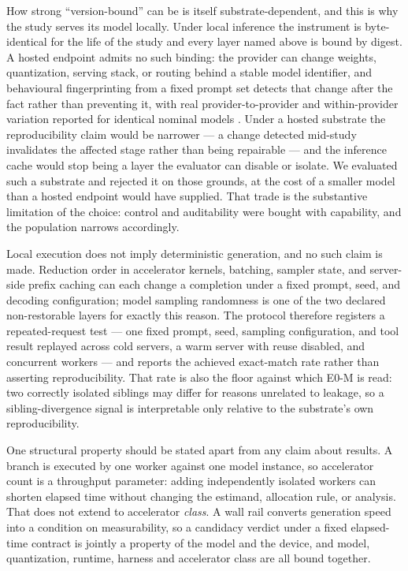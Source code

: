 How strong ``version-bound'' can be is itself substrate-dependent, and this is
why the study serves its model locally.  Under local inference the instrument is
byte-identical for the life of the study and every layer named above is bound by
digest.  A hosted endpoint admits no such binding: the provider can change
weights, quantization, serving stack, or routing behind a stable model
identifier, and behavioural fingerprinting from a fixed prompt set detects that
change after the fact rather than preventing it, with real
provider-to-provider and within-provider variation reported for identical
nominal models \citep{fingerprints2026}.  Under a hosted substrate the
reproducibility claim would be narrower --- a change detected mid-study
invalidates the affected stage rather than being repairable --- and the inference
cache would stop being a layer the evaluator can disable or isolate.  We
evaluated such a substrate and rejected it on those grounds, at the cost of a
smaller model than a hosted endpoint would have supplied.  That trade is the
substantive limitation of the choice: control and auditability were bought with
capability, and the population narrows accordingly.

Local execution does not imply deterministic generation, and no such claim is
made.  Reduction order in accelerator kernels, batching, sampler state, and
server-side prefix caching can each change a completion under a fixed prompt,
seed, and decoding configuration; model sampling randomness is one of the two
declared non-restorable layers for exactly this reason.  The protocol therefore
registers a repeated-request test --- one fixed prompt, seed, sampling
configuration, and tool result replayed across cold servers, a warm server with
reuse disabled, and concurrent workers --- and reports the achieved exact-match
rate rather than asserting reproducibility.  That rate is also the floor against
which E0-M is read: two correctly isolated siblings may differ for reasons
unrelated to leakage, so a sibling-divergence signal is interpretable only
relative to the substrate's own reproducibility.

One structural property should be stated apart from any claim about results.  A
branch is executed by one worker against one model instance, so accelerator
count is a throughput parameter: adding independently isolated workers can
shorten elapsed time without changing the estimand, allocation rule, or
analysis.  That does not extend to accelerator \emph{class}.  A wall rail
converts generation speed into a condition on measurability, so a candidacy
verdict under a fixed elapsed-time contract is jointly a property of the model
and the device, and model, quantization, runtime, harness and accelerator class
are all bound together.

